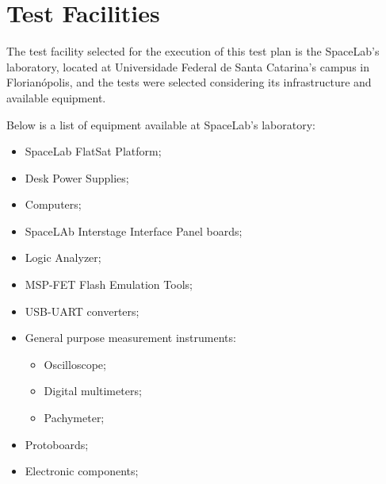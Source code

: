 %
%
%
%
%

%
%
%
%
%

\chapter{Test Facilities} \label{ch:test-facilities}

The test facility selected for the execution of this test plan is the SpaceLab's laboratory, located at Universidade Federal de Santa Catarina's campus in Florianópolis, and the tests were selected considering its infrastructure and available equipment.

Below is a list of equipment available at SpaceLab's laboratory:

\begin{itemize}
    \item SpaceLab FlatSat Platform;
    \item Desk Power Supplies;
    \item Computers;
    \item SpaceLAb Interstage Interface Panel boards;
    \item Logic Analyzer;
    \item MSP-FET Flash Emulation Tools;
    \item USB-UART converters;
    \item General purpose measurement instruments:
    \begin{itemize}
        \item Oscilloscope;
        \item Digital multimeters;
        \item Pachymeter;
    \end{itemize}
    \item Protoboards;
    \item Electronic components;
\end{itemize}